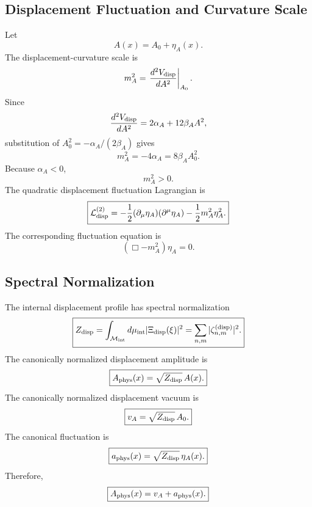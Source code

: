 \documentclass[11pt]{article}
\begin{document}
\subsection{Displacement Fluctuation and Curvature Scale}

Let
\begin{equation}
\boxed{
A(x)=A_0+\eta_A(x).
}
\end{equation}
The displacement-curvature scale is
\begin{equation}
m_A^2
=
\left.
\frac{d^2V_{\rm disp}}{dA^2}
\right|_{A_0}.
\end{equation}
Since
\begin{equation}
\frac{d^2V_{\rm disp}}{dA^2}
=
2\alpha_A+12\beta_AA^2,
\end{equation}
substitution of \(A_0^2=-\alpha_A/(2\beta_A)\) gives
\begin{equation}
\boxed{
m_A^2
=
-4\alpha_A
=
8\beta_AA_0^2.
}
\end{equation}
Because \(\alpha_A<0\),
\begin{equation}
\boxed{
m_A^2>0.
}
\end{equation}
The quadratic displacement fluctuation Lagrangian is
\begin{equation}
\boxed{
\mathcal L_{\rm disp}^{(2)}
=
-\frac12
(\partial_\mu\eta_A)(\partial^\mu\eta_A)
-
\frac12m_A^2\eta_A^2.
}
\end{equation}
The corresponding fluctuation equation is
\begin{equation}
\boxed{
(\Box-m_A^2)\eta_A=0.
}
\end{equation}

\subsection{Spectral Normalization}

The internal displacement profile has spectral normalization
\begin{equation}
\boxed{
Z_{\rm disp}
=
\int_{\mathcal M_{\rm int}}
d\mu_{\rm int}
|\Xi_{\rm disp}(\xi)|^2
=
\sum_{n,m}
|\zeta_{n,m}^{({\rm disp})}|^2.
}
\end{equation}
The canonically normalized displacement amplitude is
\begin{equation}
\boxed{
A_{\rm phys}(x)
=
\sqrt{Z_{\rm disp}}\,A(x).
}
\end{equation}
The canonically normalized displacement vacuum is
\begin{equation}
\boxed{
v_A
=
\sqrt{Z_{\rm disp}}\,A_0.
}
\end{equation}
The canonical fluctuation is
\begin{equation}
\boxed{
a_{\rm phys}(x)
=
\sqrt{Z_{\rm disp}}\,\eta_A(x).
}
\end{equation}
Therefore,
\begin{equation}
\boxed{
A_{\rm phys}(x)
=
v_A+a_{\rm phys}(x).
}
\end{equation}
\end{document}
